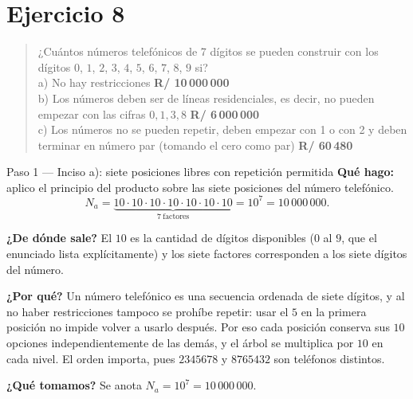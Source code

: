 \documentclass[11pt]{article}
\begin{document}
\section*{Ejercicio 8}

\begin{quote}
¿Cuántos números telefónicos de 7 dígitos se pueden construir con los dígitos $0$, $1$, $2$, $3$, $4$, $5$, $6$, $7$, $8$, $9$ si?\\[2pt]
a) No hay restricciones \quad \textbf{R/ 10\,000\,000}\\
b) Los números deben ser de líneas residenciales, es decir, no pueden empezar con las cifras $0, 1, 3, 8$ \quad \textbf{R/ 6\,000\,000}\\
c) Los números no se pueden repetir, deben empezar con 1 o con 2 y deben terminar en número par (tomando el cero como par) \quad \textbf{R/ 60\,480}
\end{quote}

\begin{paso}{Paso 1 --- Inciso a): siete posiciones libres con repetición permitida}
\textbf{Qué hago:} aplico el principio del producto sobre las siete posiciones del número telefónico.
\[
  N_a = \underbrace{10\cdot 10\cdot 10\cdot 10\cdot 10\cdot 10\cdot 10}_{7\ \text{factores}} = 10^{7} = 10\,000\,000 .
\]

\textbf{¿De dónde sale?} El $10$ es la cantidad de dígitos disponibles ($0$ al $9$, que el enunciado lista explícitamente) y los siete factores corresponden a los siete dígitos del número.

\textbf{¿Por qué?} Un número telefónico es una secuencia ordenada de siete dígitos, y al no haber restricciones tampoco se prohíbe repetir: usar el $5$ en la primera posición no impide volver a usarlo después. Por eso cada posición conserva sus $10$ opciones independientemente de las demás, y el árbol se multiplica por $10$ en cada nivel. El orden importa, pues $2345678$ y $8765432$ son teléfonos distintos.

\textbf{¿Qué tomamos?} Se anota $N_a=10^7=10\,000\,000$.
\end{paso}
\end{document}
